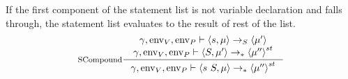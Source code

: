 \documentclass[a4paper, 10pt, draft]{report}
\newcommand{\mycode}[1]{\ensuremath{\mbox{\lstinline{#1}}}}
\begin{document}
If the first component of the statement list is not variable declaration and
falls through, the statement list evaluates to the result of rest of the list.
\[\inference[SCompound]
{ %
  \gamma, \operatorname{env}_V, \operatorname{env}_P |- \left\langle
    s, \mu
  \right\rangle ->_S \left\langle
    \mu'
  \right\rangle \\
  \gamma, \operatorname{env}_V, \operatorname{env}_P |- \left\langle
    S, \mu'
  \right\rangle ->_{*} \left\langle
    \mu''
  \right\rangle ^ {st}
}{ %
  \gamma, \operatorname{env}_V, \operatorname{env}_P |- \left\langle
    s\ S, \mu
  \right\rangle ->_{*} \left\langle
    \mu''
  \right\rangle ^ {st}
}\]
\end{document}
